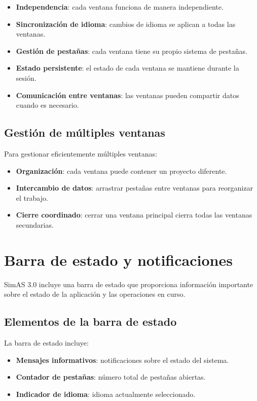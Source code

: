 \begin{itemize}
    \item \textbf{Independencia}: cada ventana funciona de manera independiente.    
    \item \textbf{Sincronización de idioma}: cambios de idioma se aplican a todas las ventanas.
    \item \textbf{Gestión de pestañas}: cada ventana tiene su propio sistema de pestañas.
    \item \textbf{Estado persistente}: el estado de cada ventana se mantiene durante la sesión.
    \item \textbf{Comunicación entre ventanas}: las ventanas pueden compartir datos cuando es necesario.
\end{itemize}

\subsection{Gestión de múltiples ventanas}

Para gestionar eficientemente múltiples ventanas:

\begin{itemize}
    \item \textbf{Organización}: cada ventana puede contener un proyecto diferente.
    \item \textbf{Intercambio de datos}: arrastrar pestañas entre ventanas para reorganizar el trabajo.
    \item \textbf{Cierre coordinado}: cerrar una ventana principal cierra todas las ventanas secundarias.
\end{itemize}

\section{Barra de estado y notificaciones}

SimAS 3.0 incluye una barra de estado que proporciona información importante sobre el estado de la aplicación y las operaciones en curso.

\subsection{Elementos de la barra de estado}

La barra de estado incluye:

\begin{itemize}
    \item \textbf{Mensajes informativos}: notificaciones sobre el estado del sistema.
    \item \textbf{Contador de pestañas}: número total de pestañas abiertas.
    \item \textbf{Indicador de idioma}: idioma actualmente seleccionado.
\end{itemize}

